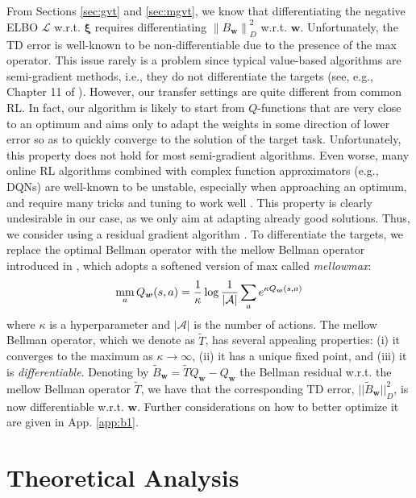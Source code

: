 \documentclass{article}
\newcommand{\mm}{\operatornamewithlimits{mm}}
\newcommand{\wt}[1]{\widetilde{#1}}
\newcommand{\norm}[1]{\left\lVert #1 \right\rVert}
\begin{document}
From Sections \ref{sec:gvt} and \ref{sec:mgvt}, we know that differentiating the negative ELBO $\mathcal{L}$ w.r.t. $\bm{\xi}$ requires differentiating $\norm{B_{\bm{w}}}_D^2$ w.r.t. $\bm{w}$. Unfortunately, the TD error is well-known to be non-differentiable due to the presence of the max operator. This issue rarely is a problem since typical value-based algorithms are semi-gradient methods, i.e., they do not differentiate the targets (see, e.g., Chapter 11 of \cite{sutton1998reinforcement}). However, our transfer settings are quite different from common RL. In fact, our algorithm is likely to start from $Q$-functions that are very close to an optimum and aims only to adapt the weights in some direction of lower error so as to quickly converge to the solution of the target task. Unfortunately, this property does not hold for most semi-gradient algorithms. Even worse, many online RL algorithms combined with complex function approximators (e.g., DQNs) are well-known to be unstable, especially when approaching an optimum, and require many tricks and tuning to work well \cite{schaul2015prioritized,van2016deep}. This property is clearly undesirable in our case, as we only aim at adapting already good solutions. Thus, we consider using a residual gradient algorithm \cite{baird1995residual}. To differentiate the targets, we replace the optimal Bellman operator with the mellow Bellman operator introduced in \cite{asadi2017alternative}, which adopts a softened version of max called \textit{mellowmax}:
\begin{equation}
\mm_a Q_{\bm{w}}(s,a) = \frac{1}{\kappa} \log \frac{1}{|\mathcal{A}|}\sum_a e^{\kappa Q_{\bm{w}}(s,a)}
\end{equation}
where $\kappa$ is a hyperparameter and $|\mathcal{A}|$ is the number of actions. The mellow Bellman operator, which we denote as $\wt{T}$, has several appealing properties: (i) it converges to the maximum as $\kappa \rightarrow \infty$, (ii) it has a unique fixed point, and (iii) it is \textit{differentiable}. Denoting by $\wt{B}_{\bm{w}} = \wt{T}Q_{\bm{w}} - Q_{\bm{w}}$ the Bellman residual w.r.t. the mellow Bellman operator $\wt{T}$, we have that the corresponding TD error, $||\wt{B}_{\bm{w}}||_D^2$, is now differentiable w.r.t. $\bm{w}$. Further considerations on how to better optimize it are given in App. \ref{app:b1}.

\section{Theoretical Analysis}\label{sec:theory}
\end{document}
